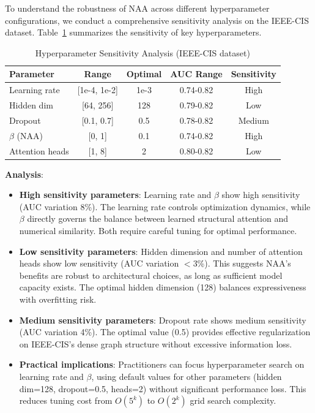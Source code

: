 To understand the robustness of NAA across different hyperparameter configurations, we conduct a comprehensive sensitivity analysis on the IEEE-CIS dataset. Table~\ref{tab:hyperparam_sensitivity} summarizes the sensitivity of key hyperparameters.

\begin{table}[t]
\centering
\caption{Hyperparameter Sensitivity Analysis (IEEE-CIS dataset)}
\label{tab:hyperparam_sensitivity}
\small
\begin{tabular}{lcccc}
\toprule
\textbf{Parameter} & \textbf{Range} & \textbf{Optimal} & \textbf{AUC Range} & \textbf{Sensitivity} \\
\midrule
Learning rate & [1e-4, 1e-2] & 1e-3 & 0.74-0.82 & High \\
Hidden dim & [64, 256] & 128 & 0.79-0.82 & Low \\
Dropout & [0.1, 0.7] & 0.5 & 0.78-0.82 & Medium \\
$\beta$ (NAA) & [0, 1] & 0.1 & 0.74-0.82 & High \\
Attention heads & [1, 8] & 2 & 0.80-0.82 & Low \\
\bottomrule
\end{tabular}
\end{table}

\textbf{Analysis}:

\begin{itemize}
\item \textbf{High sensitivity parameters}: Learning rate and $\beta$ show high sensitivity (AUC variation 8\%). The learning rate controls optimization dynamics, while $\beta$ directly governs the balance between learned structural attention and numerical similarity. Both require careful tuning for optimal performance.

\item \textbf{Low sensitivity parameters}: Hidden dimension and number of attention heads show low sensitivity (AUC variation $<$3\%). This suggests NAA's benefits are robust to architectural choices, as long as sufficient model capacity exists. The optimal hidden dimension (128) balances expressiveness with overfitting risk.

\item \textbf{Medium sensitivity parameters}: Dropout rate shows medium sensitivity (AUC variation 4\%). The optimal value (0.5) provides effective regularization on IEEE-CIS's dense graph structure without excessive information loss.

\item \textbf{Practical implications}: Practitioners can focus hyperparameter search on learning rate and $\beta$, using default values for other parameters (hidden dim=128, dropout=0.5, heads=2) without significant performance loss. This reduces tuning cost from $O(5^k)$ to $O(2^k)$ grid search complexity.
\end{itemize}

